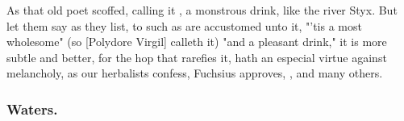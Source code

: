 
As that old poet scoffed, calling it , a monstrous drink, like the river Styx. But let them say as
they list, to such as are accustomed unto it, "'tis a most wholesome" (so
[Polydore Virgil] calleth it) "and
a pleasant drink," it is more subtle and better, for the hop that rarefies it,
hath an especial virtue against melancholy, as our herbalists confess, Fuchsius
approves, , and many
others.

\subsubsection{Waters.}

